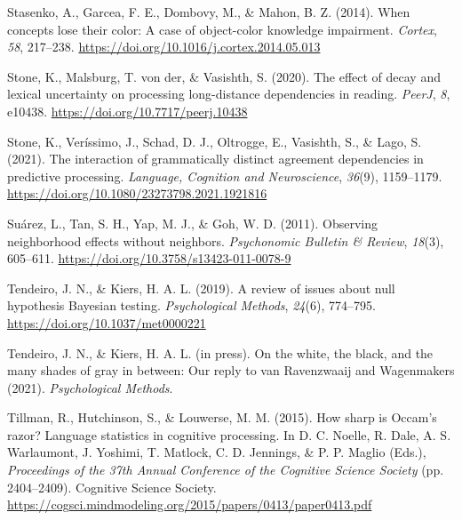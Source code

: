 \documentclass[
  12pt,
  man,floatsintext]{apa7}
\newlength{\cslhangindent}
\newlength{\cslentryspacingunit} %
\newenvironment{CSLReferences}[2] %
 {%
  \setlength{\parindent}{0pt}
  \ifodd #1
  \let\oldpar\par
  \def\par{\hangindent=\cslhangindent\oldpar}
  \fi
  \setlength{\parskip}{#2\cslentryspacingunit}
 }%
 {}
\begin{document}
\begin{CSLReferences}{1}{0}
\leavevmode{}%
Stasenko, A., Garcea, F. E., Dombovy, M., \& Mahon, B. Z. (2014). When concepts lose their color: {A} case of object-color knowledge impairment. \emph{Cortex}, \emph{58}, 217--238. \url{https://doi.org/10.1016/j.cortex.2014.05.013}

\leavevmode{}%
Stone, K., Malsburg, T. von der, \& Vasishth, S. (2020). The effect of decay and lexical uncertainty on processing long-distance dependencies in reading. \emph{PeerJ}, \emph{8}, e10438. \url{https://doi.org/10.7717/peerj.10438}

\leavevmode{}%
Stone, K., Veríssimo, J., Schad, D. J., Oltrogge, E., Vasishth, S., \& Lago, S. (2021). The interaction of grammatically distinct agreement dependencies in predictive processing. \emph{Language, Cognition and Neuroscience}, \emph{36}(9), 1159--1179. \url{https://doi.org/10.1080/23273798.2021.1921816}

\leavevmode{}%
Suárez, L., Tan, S. H., Yap, M. J., \& Goh, W. D. (2011). Observing neighborhood effects without neighbors. \emph{Psychonomic Bulletin \& Review}, \emph{18}(3), 605--611. \url{https://doi.org/10.3758/s13423-011-0078-9}

\leavevmode{}%
Tendeiro, J. N., \& Kiers, H. A. L. (2019). A review of issues about null hypothesis {Bayesian} testing. \emph{Psychological Methods}, \emph{24}(6), 774--795. \url{https://doi.org/10.1037/met0000221}

\leavevmode{}%
Tendeiro, J. N., \& Kiers, H. A. L. (in press). On the white, the black, and the many shades of gray in between: {Our} reply to van {Ravenzwaaij} and {Wagenmakers} (2021). \emph{Psychological Methods}.

\leavevmode{}%
Tillman, R., Hutchinson, S., \& Louwerse, M. M. (2015). How sharp is {Occam}'s razor? {Language} statistics in cognitive processing. In D. C. Noelle, R. Dale, A. S. Warlaumont, J. Yoshimi, T. Matlock, C. D. Jennings, \& P. P. Maglio (Eds.), \emph{Proceedings of the 37th {Annual Conference} of the {Cognitive Science Society}} (pp. 2404--2409). {Cognitive Science Society}. \url{https://cogsci.mindmodeling.org/2015/papers/0413/paper0413.pdf}


\end{CSLReferences}
\end{document}
